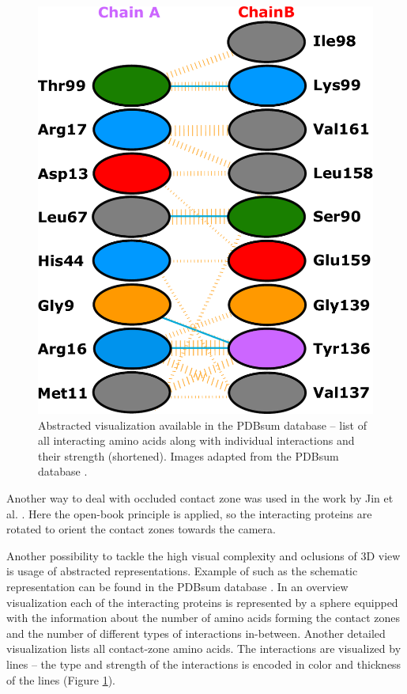 \begin{figure}
\vspace{-10pt}
  \begin{center}
  \includegraphics[width=\linewidth]{pictures/pdbsum2.pdf}
  \caption{Abstracted visualization available in the PDBsum database -- list of all interacting amino acids along with individual interactions and their strength (shortened). Images adapted from the PDBsum database \cite{laskowski1997pdbsum}.}
  \label{Fig:pdbsum}  
  \end{center}
\end{figure}

Another way to deal with occluded contact zone was used in the work by Jin et al. \cite{jin2014targeting}. Here the open-book principle is applied, so the interacting proteins are rotated to orient the contact zones towards the camera.

Another possibility to tackle the high visual complexity and oclusions of 3D view is usage of abstracted representations. Example of such as the schematic representation can be found in the PDBsum database \cite{laskowski1997pdbsum}. In an overview visualization each of the interacting proteins is represented by a sphere equipped with the information about the number of amino acids forming the contact zones and the number of different types of interactions in-between. Another detailed visualization lists all contact-zone amino acids. The interactions are visualized by lines -- the type and strength of the interactions is encoded in color and thickness of the lines (Figure \ref{Fig:pdbsum}).






